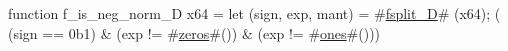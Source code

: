 function f_is_neg_norm_D   x64 = {
  let (sign, exp, mant) = #\hyperref[sailRISCVzfsplitzyD]{fsplit\_D}# (x64);
  (  (sign == 0b1)
   & (exp  != #\hyperref[sailRISCVzzzeros]{zeros}#())
   & (exp  != #\hyperref[sailRISCVzones]{ones}#()))
}
